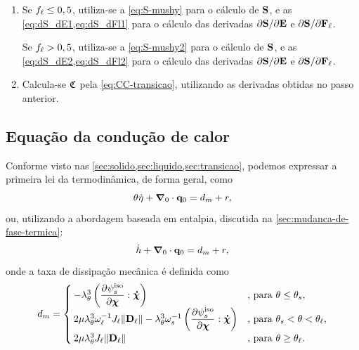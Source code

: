 \documentclass[Tese.tex]{subfiles}
\begin{document}
\begin{quadro}[!htb]
{\begin{minipage}{\textwidth}
\begin{enumerate}[label=\arabic*.]
				\item Se $\liquidFraction \leq 0,5$, utiliza-se a \cref{eq:S-mushy} para o cálculo de $\S$, e as \cref{eq:dS_dE1,eq:dS_dFl1} para o cálculo das derivadas ${\partial\S}/{\partial\E}$ e ${\partial\S}/{\partial\Fl}$.
				
				Se $\liquidFraction > 0,5$, utiliza-se a \cref{eq:S-mushy2} para o cálculo de $\S$, e as \cref{eq:dS_dE2,eq:dS_dFl2} para o cálculo das derivadas ${\partial\S}/{\partial\E}$ e ${\partial\S}/{\partial\Fl}$.
				
				\item Calcula-se $\CC$ pela \cref{eq:CC-transicao}, utilizando as derivadas obtidas no passo anterior.
			\end{enumerate}
			
			\vspace{0.01cm}
		\end{minipage}
	}
\end{quadro}

\subsection{Equação da condução de calor}

Conforme visto nas \cref{sec:solido,sec:liquido,sec:transicao}, podemos expressar a primeira lei da termodinâmica, de forma geral, como
\begin{equation}\label{eq:primeira-lei-mudanca}
\temp \dotentropy + \gradientei\cdot\qi = \dissipationmec + \calorInt,
\end{equation}
ou, utilizando a abordagem baseada em entalpia, discutida na \cref{sec:mudanca-de-fase-termica}:
\begin{equation}
\dotenthalpy + \gradientei\cdot\qi = \dissipationmec + \calorInt,
\end{equation}
onde a taxa de dissipação mecânica é definida como
\begin{equation} \label{eq:dissipation-general}
\dissipationmec = 
\begin{cases}
-\alongTermico^3\left(\dfrac{\partial\helmholtzs}{\partial\internalVariables}:\dotInternalVariables\right) &\text{, para }\temp \leq \solidusTemp, \\
2\viscfluid\alongTermico^3\liquidMultiplier^{-1}\Jl\|\Dl\| - \alongTermico^3\solidMultiplier^{-1}\left(\dfrac{\partial\helmholtzs}{\partial\internalVariables}:\dotInternalVariables\right)&\text{, para }\solidusTemp < \temp < \liquidusTemp, \\
2\viscfluid\alongTermico^3\Jl\|\Dl\|&\text{, para }\temp \geq \liquidusTemp.
\end{cases}
\end{equation}
\end{document}
